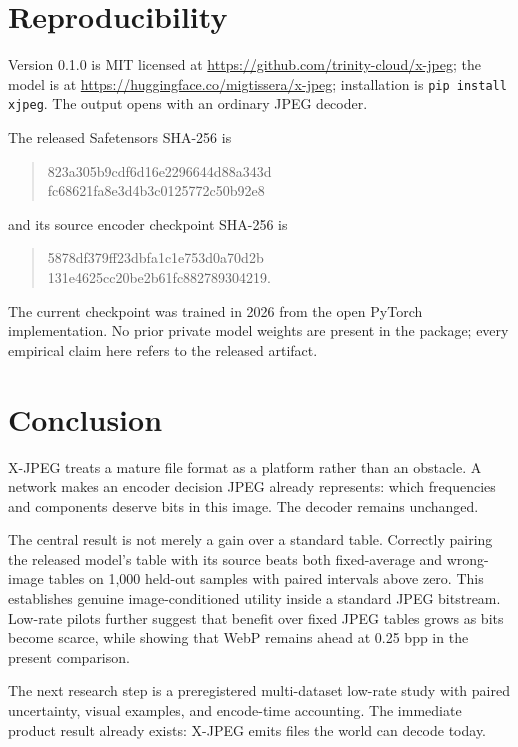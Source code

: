 \documentclass[10pt,twocolumn]{article}
\newcommand{\xjpeg}{X-JPEG}
\begin{document}
\section{Reproducibility}

Version 0.1.0 is MIT licensed at \url{https://github.com/trinity-cloud/x-jpeg}; the model is at \url{https://huggingface.co/migtissera/x-jpeg}; installation is \texttt{pip install xjpeg}. The output opens with an ordinary JPEG decoder.

The released Safetensors SHA-256 is
\begin{quote}\ttfamily\footnotesize
823a305b9cdf6d16e2296644d88a343d\\
fc68621fa8e3d4b3c0125772c50b92e8
\end{quote}
and its source encoder checkpoint SHA-256 is
\begin{quote}\ttfamily\footnotesize
5878df379ff23dbfa1c1e753d0a70d2b\\
131e4625cc20be2b61fc882789304219.
\end{quote}
The current checkpoint was trained in 2026 from the open PyTorch implementation. No prior private model weights are present in the package; every empirical claim here refers to the released artifact.

\section{Conclusion}

\xjpeg{} treats a mature file format as a platform rather than an obstacle. A network makes an encoder decision JPEG already represents: which frequencies and components deserve bits in this image. The decoder remains unchanged.

The central result is not merely a gain over a standard table. Correctly pairing the released model's table with its source beats both fixed-average and wrong-image tables on 1,000 held-out samples with paired intervals above zero. This establishes genuine image-conditioned utility inside a standard JPEG bitstream. Low-rate pilots further suggest that benefit over fixed JPEG tables grows as bits become scarce, while showing that WebP remains ahead at 0.25 bpp in the present comparison.

The next research step is a preregistered multi-dataset low-rate study with paired uncertainty, visual examples, and encode-time accounting. The immediate product result already exists: \xjpeg{} emits files the world can decode today.

\balance

{\small}
\end{document}
